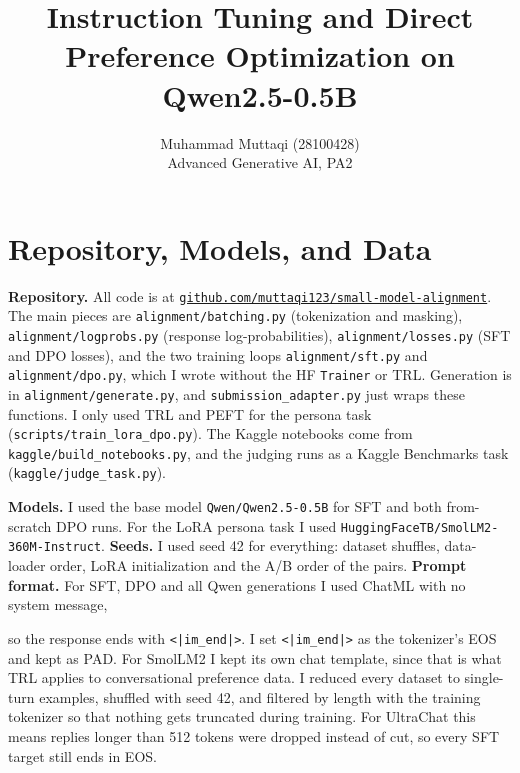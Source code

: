 \documentclass[10pt,a4paper]{article}
\title{\vspace{-8mm}\textbf{Instruction Tuning and Direct Preference Optimization on Qwen2.5-0.5B}}
\author{Muhammad Muttaqi (28100428)\\ \small Advanced Generative AI, PA2 \quad
\href{https://github.com/muttaqi123/small-model-alignment}{\code{github.com/muttaqi123/small-model-alignment}}}
\date{}
\newcommand{\code}[1]{\texttt{\small #1}}
\begin{document}
\maketitle
\vspace{-10mm}

\section{Repository, Models, and Data}

\textbf{Repository.} All code is at \href{https://github.com/muttaqi123/small-model-alignment}{\code{github.com/muttaqi123/small-model-alignment}}.
The main pieces are \code{alignment/batching.py} (tokenization and masking), \code{alignment/logprobs.py} (response log-probabilities),
\code{alignment/losses.py} (SFT and DPO losses), and the two training loops \code{alignment/sft.py} and \code{alignment/dpo.py}, which I wrote
without the HF \code{Trainer} or TRL. Generation is in \code{alignment/generate.py}, and \code{submission\_adapter.py} just wraps these functions.
I only used TRL and PEFT for the persona task (\code{scripts/train\_lora\_dpo.py}). The Kaggle notebooks come from \code{kaggle/build\_notebooks.py},
and the judging runs as a Kaggle Benchmarks task (\code{kaggle/judge\_task.py}).

\textbf{Models.} I used the base model \code{Qwen/Qwen2.5-0.5B} for SFT and both from-scratch DPO runs. For the LoRA persona task I used
\code{HuggingFaceTB/SmolLM2-360M-Instruct}. \textbf{Seeds.} I used seed 42 for everything: dataset shuffles, data-loader order, LoRA initialization and the A/B
order of the pairs. \textbf{Prompt format.} For SFT, DPO and all Qwen generations I used ChatML with no system message,
\begin{center}\vspace{-3pt}\end{center}
\vspace{-2pt}so the response ends with \code{<|im\_end|>}. I set \code{<|im\_end|>} as the tokenizer's EOS and kept \code{<|endoftext|>} as PAD. For SmolLM2 I kept its own chat
template, since that is what TRL applies to conversational preference data. I reduced every dataset to single-turn examples, shuffled with seed
42, and filtered by length with the training tokenizer so that nothing gets truncated during training. For UltraChat this means replies longer
than 512 tokens were dropped instead of cut, so every SFT target still ends in EOS.
\end{document}
